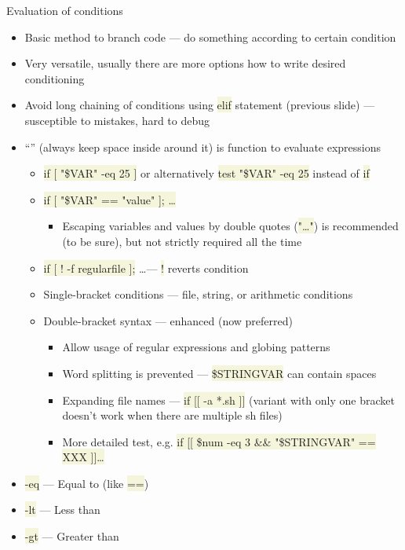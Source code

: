 \documentclass[compress, ucs, xelatex, 11pt, xcolor=svgnames, aspectratio=169,
	hyperref={
		bookmarks=true,
		unicode=true,
		colorlinks=true,
		pdftitle={Linux, command line and MetaCentrum},
		plainpages=false,
		pdfauthor={Vojtech Zeisek},
		pdfsubject={Course about use of Linux command line, writing shell scripts and using MetaCentrum of CESNET},
		pdfcreator={XeLaTeX},
		pdfkeywords={Linux, GNU, BASH, shell, command line, MetaCentrum},
		linkcolor=DarkRed, %
		anchorcolor=DarkBlue, %
		citecolor=Indigo, %
		filecolor=NavyBlue, %
		menucolor=DarkMagenta, %
		urlcolor=DarkBlue, %
		pdftex},
	url={hyphens, lowtilde} %
	]{beamer}
\renewcommand{\texttt}[1]{\colorbox{Beige}{{\ttfamily #1}}}
\begin{document}
\begin{frame}[allowframebreaks]{Evaluation of conditions}
	\begin{itemize}
		\item Basic method to branch code --- do something according to certain condition
		\item Very versatile, usually there are more options how to write desired conditioning
		\item Avoid long chaining of conditions using \texttt{elif} statement (previous slide) --- susceptible to mistakes, hard to debug
		\item \enquote{\texttt{[~\ldots~]}} (always keep space inside around it) is function to evaluate expressions
		\begin{itemize}
			\item \texttt{if [ "\${VAR}" -eq 25 ]} or alternatively \texttt{test "\${VAR}" -eq 25} instead of \texttt{if}
			\item \texttt{if [ "\${VAR}" == "value" ]; \ldots}
			\begin{itemize}
				\item Escaping variables and values by double quotes (\texttt{"\ldots"}) is recommended (to be sure), but not strictly required all the time
			\end{itemize}
			\item \texttt{if [ ! -f regularfile ];} \ldots --- \texttt{!} reverts condition
			\item Single-bracket conditions --- file, string, or arithmetic conditions
			\item Double-bracket syntax --- enhanced (now preferred)
			\begin{itemize}
				\item Allow usage of regular expressions and globing patterns
				\item Word splitting is prevented --- \texttt{\$STRINGVAR} can contain spaces
				\item Expanding file names --- \texttt{if [[ -a *.sh ]]} (variant with only one bracket doesn't work when there are multiple sh files)
				\item More detailed test, e.g. \texttt{if [[ \$num -eq 3 \&\& "\$\textbraceleft STRINGVAR\textbraceright " == XXX ]]\ldots}
			\end{itemize}
		\end{itemize}
		\item \texttt{-eq} --- Equal to (like \texttt{==})
		\item \texttt{-lt} --- Less than
		\item \texttt{-gt} --- Greater than

\end{itemize}
\end{frame}
\end{document}

